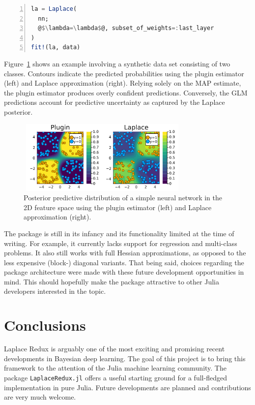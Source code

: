 \documentclass{juliacon}
\begin{document}
\begin{lstlisting}[language=Julia, escapechar=@, numbers=left, label={lst:laplace}, caption={}]
la = Laplace(
  nn;
  @$\lambda=\lambda$@, subset_of_weights=:last_layer
)
fit!(la, data)
\end{lstlisting}

Figure~\ref{fig-pred-mlp} shows an example involving a synthetic data
set consisting of two classes. Contours indicate the predicted
probabilities using the plugin estimator (left) and Laplace
approximation (right). Relying solely on the MAP estimate, the plugin
estimator produces overly confident predictions. Conversely, the GLM
predictions account for predictive uncertainty as captured by the
Laplace posterior.

\begin{figure}

{\centering \includegraphics[width=3.33333in,height=1.41667in]{www/posterior_predictive_mlp.png}

}

\caption{\label{fig-pred-mlp}Posterior predictive distribution of a
simple neural network in the 2D feature space using the plugin estimator
(left) and Laplace approximation (right).}

\end{figure}

The package is still in its infancy and its functionality limited at the
time of writing. For example, it currently lacks support for regression
and multi-class problems. It also still works with full Hessian
approximations, as opposed to the less expensive (block-) diagonal
variants. That being said, choices regarding the package architecture
were made with these future development opportunities in mind. This
should hopefully make the package attractive to other Julia developers
interested in the topic.

\hypertarget{sec-con}{%
\section{Conclusions}\label{sec-con}}

Laplace Redux is arguably one of the most exciting and promising recent
developments in Bayesian deep learning. The goal of this project is to
bring this framework to the attention of the Julia machine learning
community. The package \texttt{LaplaceRedux.jl} offers a useful starting
ground for a full-fledged implementation in pure Julia. Future
developments are planned and contributions are very much welcome.
\end{document}

